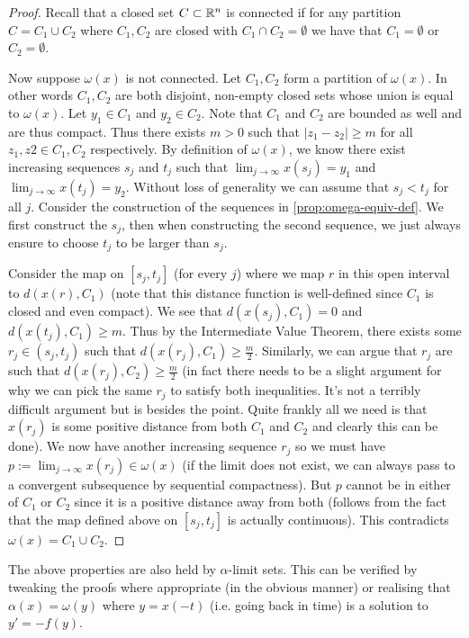 \begin{proof}
Recall that a closed set $C \subset \mathbb{R}^n$ is connected if for any partition $C = C_1 \cup C_2$ where $C_1, C_2$ are closed with $C_1 \cap C_2 = \emptyset$ we have that $C_1 = \emptyset$ or $C_2 = \emptyset$.

Now suppose $\omega(x)$ is not connected. Let $C_1, C_2$ form a partition of $\omega(x)$. In other words $C_1, C_2$ are both disjoint, non-empty closed sets whose union is equal to $\omega(x)$. Let $y_1 \in C_1$ and $y_2 \in C_2$. Note that $C_1$ and $C_2$ are bounded as well and are thus compact. Thus there exists $m > 0$ such that $\left| z_1 - z_2 \right| \geq m$ for all $z_1, z2 \in C_1, C_2$ respectively. By definition of $\omega(x)$, we know there exist increasing sequences $s_j$ and $t_j$ such that $\lim_{j \to \infty} x(s_j) = y_1$ and $\lim_{j \to \infty} x(t_j) = y_2$.  Without loss of generality we can assume that $s_j < t_j$ for all $j$. Consider the construction of the sequences in \autoref{prop:omega-equiv-def}. We first construct the $s_j$, then when constructing the second sequence, we just always ensure to choose $t_j$ to be larger than $s_j$.

Consider the map on $[s_j, t_j]$ (for every $j$) where we map $r$ in this open interval to $d(x(r), C_1)$ (note that this distance function is well-defined since $C_1$ is closed and even compact). We see that $d(x(s_j), C_1) = 0$ and $d(x(t_j), C_1) \geq m$. Thus by the Intermediate Value Theorem, there exists some $r_j \in (s_j, t_j)$ such that $d(x(r_j), C_1) \geq \frac{m}{2}$. Similarly, we can argue that $r_j$ are such that $d(x(r_j), C_2) \geq \frac{m}{2}$ (in fact there needs to be a slight argument for why we can pick the same $r_j$ to satisfy both inequalities. It's not a terribly difficult argument but is besides the point. Quite frankly all we need is that $x(r_j)$ is some positive distance from both $C_1$ and $C_2$ and clearly this can be done). We now have another increasing sequence $r_j$ so we must have $p := \lim_{j \to \infty} x(r_j) \in \omega(x)$ (if the limit does not exist, we can always pass to a convergent subsequence by sequential compactness). But $p$ cannot be in either of $C_1$ or $C_2$ since it is a positive distance away from both (follows from the fact that the map defined above on $[s_j, t_j]$ is actually continuous). This contradicts $\omega(x) = C_1 \cup C_2$.
\end{proof}
\begin{remark}
The above properties are also held by $\alpha$-limit sets. This can be verified by tweaking the proofs where appropriate (in the obvious manner) or realising that $\alpha(x) = \omega(y)$ where $y = x(-t)$ (i.e. going back in time) is a solution to $y' = -f(y)$.
\end{remark}

